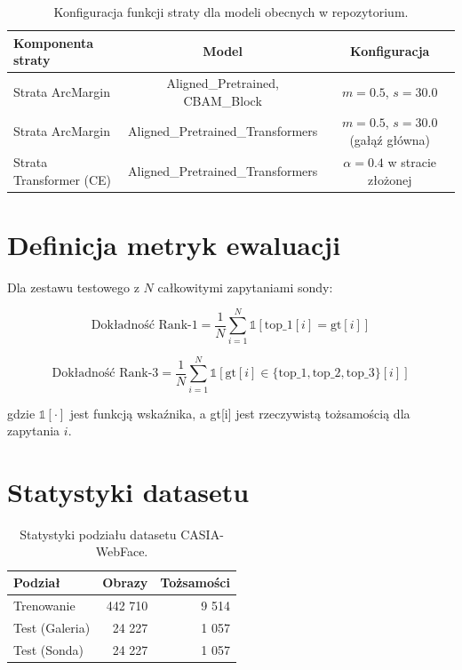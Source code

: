 \begin{table}[H]
\centering
\small
\begin{tabular}{lcc}
\toprule
\textbf{Komponenta straty} & \textbf{Model} & \textbf{Konfiguracja} \\
\midrule
Strata ArcMargin & Aligned\_Pretrained, CBAM\_Block & $m=0.5$, $s=30.0$ \\
Strata ArcMargin & Aligned\_Pretrained\_Transformers & $m=0.5$, $s=30.0$ (gałąź główna) \\
Strata Transformer (CE) & Aligned\_Pretrained\_Transformers & $\alpha=0.4$ w stracie złożonej \\
\bottomrule
\end{tabular}
\caption{Konfiguracja funkcji straty dla modeli obecnych w repozytorium.}
\label{tab:loss_params}
\end{table}


\section{Definicja metryk ewaluacji}
\label{app:metrics}

Dla zestawu testowego z $N$ całkowitymi zapytaniami sondy:

\begin{equation}
\text{Dokładność Rank-1} = \frac{1}{N} \sum_{i=1}^{N} \mathbb{1}[\text{top}\_1[i] = \text{gt}[i]]
\end{equation}

\begin{equation}
\text{Dokładność Rank-3} = \frac{1}{N} \sum_{i=1}^{N} \mathbb{1}[\text{gt}[i] \in \{\text{top}\_1, \text{top}\_2, \text{top}\_3\}[i]]
\end{equation}

gdzie $\mathbb{1}[\cdot]$ jest funkcją wskaźnika, a gt[i] jest rzeczywistą tożsamością dla zapytania $i$.

\section{Statystyki datasetu}
\label{app:dataset}

\begin{table}[H]
\centering
\small
\begin{tabular}{lrr}
\toprule
\textbf{Podział} & \textbf{Obrazy} & \textbf{Tożsamości} \\
\midrule
Trenowanie & 442 710 & 9 514 \\
Test (Galeria) & 24 227 & 1 057 \\
Test (Sonda) & 24 227 & 1 057 \\
\bottomrule
\end{tabular}
\caption{Statystyki podziału datasetu CASIA-WebFace.}
\label{tab:dataset_stats}
\end{table}
